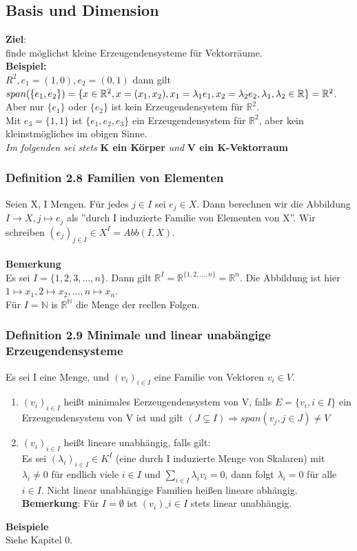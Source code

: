 \documentclass{scrartcl}
\newcommand{\lb}{\lambda}
\newcommand{\R}{\mathbb{R}}
\newcommand{\N}{\mathbb{N}}
\begin{document}
\subsection{Basis und Dimension}
\textbf{Ziel}:\\
finde m\"oglichst kleine Erzeugendensysteme f\"ur Vektorr\"aume.\\
\textbf{Beispiel:}\\
\(R^2, e_1=(1, 0), e_2 = (0,1)\) dann gilt \(span(\{e_1, e_2\})\\
= \{x \in \R^2, x = (x_1, x_2), x_1 = \lb_1 e_1, x_2 = \lb_2 e_2, \lb_1, \lb_2 \in \R\} = \R^2\). Aber nur \(\{e_1\}\) oder \(\{e_2\}\) ist kein Erzeugendensystem f\"ur \(\R^2\).\\
Mit \(e_3 = \{1, 1\}\) ist \(\{e_1, e_2, e_3\}\) ein Erzeugendensystem f\"ur \(\R^2\), aber kein kleinstm\"ogliches im obigen Sinne.\\
\textit{Im folgenden sei stets} \textbf{K ein K\"orper} \textit{und} \textbf{V ein K-Vektorraum}

\subsubsection{Definition 2.8 Familien von Elementen} 
Seien X, I Mengen. F\"ur jedes \(j \in I\) sei \(e_j \in X\). Dann berechnen wir die Abbildung \(I \to X, j \mapsto e_j\) als ''durch I induzierte Familie von Elementen von X''. Wir schreiben \((e_j)_{j \in I} \in X^I = Abb(I, X)\).\\
\\
\textbf{Bemerkung}\\
Es sei \(I = \{1, 2, 3, \dots, n\}\). Dann gilt \(\R^I = \R^{\{1, 2, \dots, n\}} = \R^n\). Die Abbildung ist hier \(1 \mapsto x_1, 2 \mapsto x_2, \dots, n \mapsto x_n\).
\\
F\"ur \(I = \N\) is \(\R^\N\) die Menge der reellen Folgen.

\subsubsection{Definition 2.9 Minimale und linear unab\"angige Erzeugendensysteme}
Es sei I eine Menge, und \((v_i)_{i \in I}\) eine Familie von Vektoren \(v_i \in V\).
\begin{enumerate}
\item{\((v_i)_{i \in I}\) hei\ss{}t minimales Eerzeugendensystem von V, falls \(E = \{v_i, i \in I\}\) ein Erzeugendensystem von V ist und gilt \((J \subsetneq I) \Rightarrow span(v_j, j \in J) \neq V\)}
\item{\((v_i)_{i \in I}\) hei\ss{}t lineare unabh\"angig, falls gilt:\\
Es sei \((\lb_i)_{i \in I} \in K^I\) (eine durch I induzierte Menge von Skalaren) mit \(\lb_i \neq 0\) f\"ur endlich viele \(i \in I\) und \(\sum_{i \in I} \lb_i v_i = 0\), dann folgt \(\lb_i = 0\) f\"ur alle \(i \in I\). Nicht linear unabh\"angige Familien hei\ss{}en lineare abh\"angig.\\
\textbf{Bemerkung}: F\"ur \(I = \emptyset\) ist \((v_i)\_{i \in I}\) stets linear unabh\"angig.}
\end{enumerate}
\textbf{Beispiele}\\
Siehe Kapitel 0.
\end{document}

